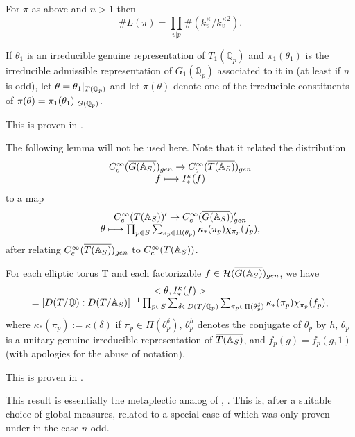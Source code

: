 \begin{remark}\label{rem:7.19} For $\pi$ as above and $n>1$ then
\[
\# L(\pi)=
\prod_{v|p}\#( k_v^\times/k_v^{\times 2}).
\]
\end{remark}

\begin{lemma}\label{lem:7.20} If $\theta_1$ is an irreducible genuine representation
of ${T_1({\mathbb Q}_p)}$ and $\pi_1(\theta_1)$ is the
irreducible admissible representation of
${G_1({\mathbb Q}_p)}$ associated to it in \cite{J2}
(at least if $n$ is odd), let
$\theta =\theta_1|_{{T(\mathbb{Q} _p)}}$ and let
$\pi(\theta)$ denote one of the irreducible
constituents of
$\pi(\theta) =\pi_1(\theta_1)|_{G(\mathbb{Q} _p)}$.
\end{lemma}

This is proven in \cite{J3}.

The following lemma will not be used here. Note that it related
the distribution
\[
\begin{array}{c}
C_c^\infty(\overline{G(\mathbb{A} _S)})_{gen}
\rightarrow
C_c^\infty(\overline{T(\mathbb{A} _S)})_{gen}\\
f\longmapsto I_*^\kappa(f)
\end{array}
\]
to a map
\[
\begin{array}{c}
C_c^\infty(T(\mathbb{A} _S))'
\rightarrow
C_c^\infty(\overline{G(\mathbb{A} _S)})'_{gen}\\
\theta \longmapsto
\prod_{p\in S}\sum_{\pi _p\in \Pi (\theta_p)}
\kappa _{*}(\pi _p)\chi _{\pi _p}(f_p),
\end{array}
\]
after relating $C_c^\infty(\overline{T(\mathbb{A} _S)})_{gen}$
to $C_c^\infty(T(\mathbb{A} _S))$.
\begin{lemma}\label{lem:7.21}
For each elliptic torus T and each factorizable
$f\in {\mathcal{H}}(\overline{G(\mathbb{A} _S)})_{gen}$, we have 
\[
\begin{array}{c}
<\theta ,I_{*}^\kappa (f )> \\ 
=[D(T/\mathbb{Q} ):D(T/\mathbb{A} _S)]^{-1}
\prod_{p\in S}
\sum_{\delta\in D(T/{\mathbb Q}_p)}
\sum_{\pi _p\in \Pi (\theta_p^\delta)}
\kappa _{*}(\pi _p)\chi _{\pi _p}(f_p),
\end{array}
\]
where $\kappa _{*}(\pi _p):=\kappa (\delta)$ if
$\pi _p\in \Pi (\theta_p^\delta)$,
${\theta }_p^h$ denotes the conjugate of ${\theta }_p$ by $h$,
${\theta }_p$ is a unitary genuine irreducible
representation of $\overline{T(\mathbb{A} _S)}$, and
$f_p(g)=f_p(g,1)$ (with apologies for the abuse of
notation).
\end{lemma}

This is proven in \cite{J3}.
\begin{remark}\label{rem:7.22}
This result is essentially the metaplectic analog of
\cite[(2.4-5)]{LL}, \cite[p. 762]{LL}. This is, after a suitable 
choice of global measures, related to a special case of
\cite[(3.42)]{J2} which was only proven under in the case $n$ odd.
\end{remark}

